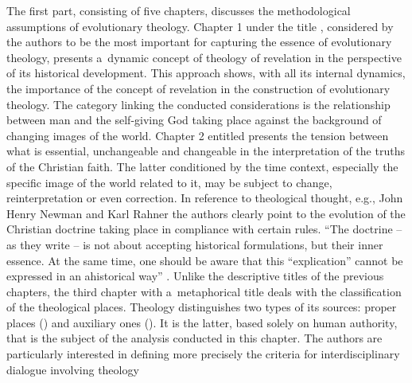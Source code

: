 The first part, consisting of five chapters, discusses the methodological assumptions of evolutionary theology. Chapter 1 under the title  
\parencite*[][pp.16–37]{}, %
 considered by the authors to be the most important for capturing the essence of evolutionary theology, presents a~dynamic concept of theology of revelation in the perspective of its historical development. This approach shows, with all its internal dynamics, the importance of the concept of revelation in the construction of evolutionary theology. The category linking the conducted considerations is the relationship between man and the self-giving God taking place against the background of changing images of the world. Chapter 2 entitled  
\parencite*[][pp.38–60]{} %
 presents the tension between what is essential, unchangeable and changeable in the interpretation of the truths of the Christian faith. The latter conditioned by the time context, especially the specific image of the world related to it, may be subject to change, reinterpretation or even correction. In reference to theological thought, e.g., John Henry Newman 
\parencite*[][pp.43–44]{} %
 and Karl Rahner 
\parencite*[][pp.50–51]{} %
 the authors clearly point to the evolution of the Christian doctrine taking place in compliance with certain rules. ``The doctrine -- as they write -- is not about accepting historical formulations, but their inner essence. At the same time, one should be aware that this ``explication'' cannot be expressed in an ahistorical way'' 
\parencite*[][p.51]{}. %
 Unlike the descriptive titles of the previous chapters, the third chapter with a~metaphorical title  
\parencite*[][pp.61–84]{} %
 deals with the classification of the theological places. Theology distinguishes two types of its sources: proper places () and auxiliary ones (). It is the latter, based solely on human authority, that is the subject of the analysis conducted in this chapter. The authors are particularly interested in defining more precisely the criteria for interdisciplinary dialogue involving theology 
